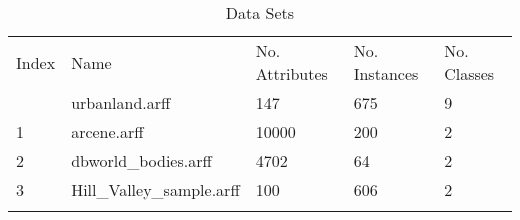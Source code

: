 \begin{table*}[h]
\caption{Data Sets}
\label{tbl:datasets}\begin{tabular}{lllll}
\noalign{\smallskip}\hline\noalign{\smallskip}
Index&Name&No. Attributes&No. Instances&No. Classes\\\noalign{\smallskip}\hline
0&urbanland.arff&147&675&9\\
1&arcene.arff&10000&200&2\\
2&dbworld_bodies.arff&4702&64&2\\
3&Hill_Valley_sample.arff&100&606&2\\
\noalign{\smallskip}\hline
\end{tabular}
\end{table*}